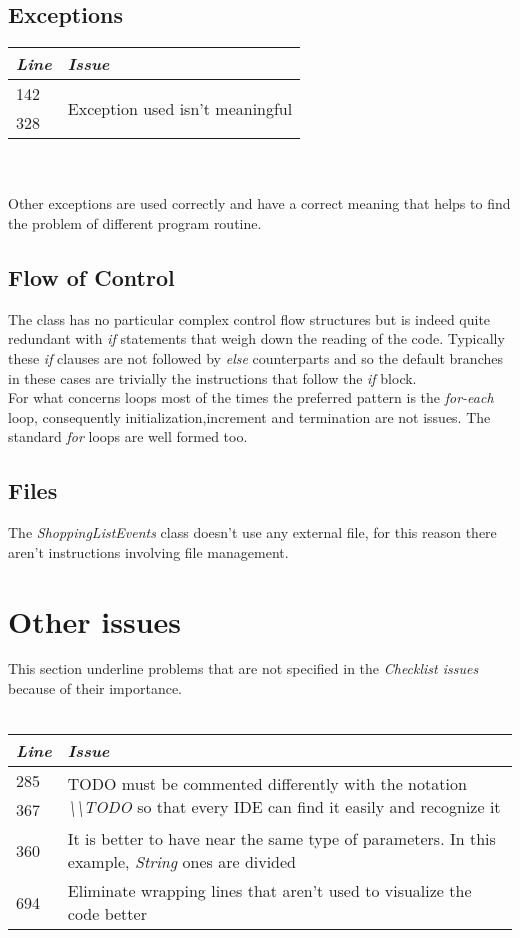 \documentclass[11pt,a4paper]{report}
\begin{document}
\subsection{Exceptions}
\begin{tabularx}{\textwidth}{|l|X|}
	\hline
	\textit{Line} & \textit{Issue}\\
	\hline
	142 & \multirow{2}{*}{Exception used isn't meaningful}\\
	328 & \\
	\hline
\end{tabularx}\\
\\
Other exceptions are used correctly and have a correct meaning that helps to find the problem of different program routine.
\subsection{Flow of Control}
The class has no particular complex control flow structures but is indeed quite redundant with \textit{if} statements that weigh down the reading of the code. Typically these \textit{if} clauses are not followed by \textit{else} counterparts and so the default branches in these cases are trivially the instructions that follow the \textit{if} block.\\For what concerns loops most of the times the preferred pattern is the \textit{for-each} loop, consequently initialization,increment and termination are not issues. The standard \textit{for} loops are well formed too.
\subsection{Files}
The \textit{ShoppingListEvents} class doesn't use any external file, for this reason there aren't instructions involving file management.
\section{Other issues}
This section underline problems that are not specified in the \textit{Checklist issues} because of their importance.\\\\
\begin{tabularx}{\textwidth}{|l|X|}
	\hline
	\textit{Line} & \textit{Issue}\\
	\hline
	285 & \multirow{2}{\linewidth}{TODO must be commented differently with the notation \textit{\textbackslash\textbackslash TODO} so that every IDE can find it easily and recognize it}\\
	367 & \\
	\hline
	360 & It is better to have near the same type of parameters. In this example, \textit{String} ones are divided\\
	\hline
	694 & Eliminate wrapping lines that aren't used to visualize the code better\\
	\hline
\end{tabularx}
\end{document}
